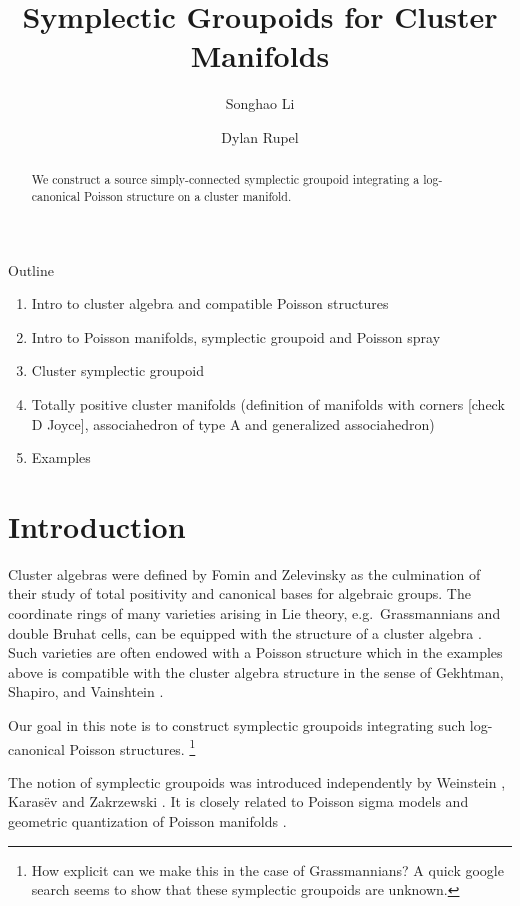 \documentclass{amsart}
\title{Symplectic Groupoids for Cluster Manifolds}
\author{Songhao Li}
\author{Dylan Rupel}
\numberwithin{equation}{section}
\begin{document}
\begin{abstract}
  We construct a source simply-connected symplectic groupoid integrating a log-canonical Poisson structure on a cluster manifold.
\end{abstract}
\maketitle
Outline
\begin{enumerate}
	\item Intro to cluster algebra and compatible Poisson structures 
	\item Intro to Poisson manifolds, symplectic groupoid and Poisson spray
	\item Cluster symplectic groupoid
	\item Totally positive cluster manifolds (definition of manifolds with corners [check D Joyce], associahedron of type A and generalized associahedron)
	\item Examples
\end{enumerate}

\section{Introduction}
Cluster algebras were defined by Fomin and Zelevinsky \cite{fomin-zelevinsky1} as the culmination of their study of total positivity and canonical bases for algebraic groups.
The coordinate rings of many varieties arising in Lie theory, e.g.\ Grassmannians and double Bruhat cells, can be equipped with the structure of a cluster algebra \cite{berenstein-fomin-zelevinsky,scott,gekhtman-shapiro-vainshtein,williams}.
Such varieties are often endowed with a Poisson structure which in the examples above is compatible with the cluster algebra structure in the sense of Gekhtman, Shapiro, and Vainshtein \cite{gsv}.

Our goal in this note is to construct symplectic groupoids integrating such log-canonical Poisson structures.
\footnote{How explicit can we make this in the case of Grassmannians?  A quick google search seems to show that these symplectic groupoids are unknown.}

The notion of symplectic groupoids was introduced independently by Weinstein \cite{MR866024}, Karas\"{e}v \cite{MR1008479} and Zakrzewski \cite{MR1081010, MR1081011}. It is closely related to Poisson sigma models \cite{MR1938552} and geometric quantization of Poisson manifolds \cite{MR2417440, MR2925830}.
\end{document}
